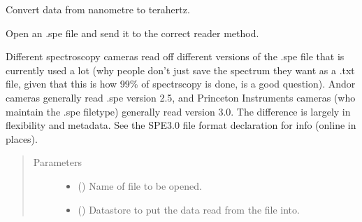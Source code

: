 \documentclass[a4paper,10pt,english]{sphinxmanual}
\begin{document}
\begin{fulllineitems}
\begin{fulllineitems}
\end{fulllineitems}


\begin{fulllineitems}
\label{\detokenize{sfgtools:sfgtools.SFGProcessTools.nm_to_thz}}
\sphinxAtStartPar
Convert data from nanometre to terahertz.

\end{fulllineitems}


\begin{fulllineitems}
\label{\detokenize{sfgtools:sfgtools.SFGProcessTools.open_spe}}
\sphinxAtStartPar
Open an .spe file and send it to the correct reader method.

\sphinxAtStartPar
Different spectroscopy cameras read off different versions of the .spe file that is currently used
a lot (why people don’t just save the spectrum they want as a .txt file, given that this is how 99\%
of spectrscopy is done, is a good question). Andor cameras generally read .spe version 2.5,
and Princeton Instruments cameras (who maintain the .spe filetype) generally read version 3.0. The
difference is largely in flexibility and metadata. See the SPE3.0 file format declaration for info
(online in places).
\begin{quote}\begin{description}
\item[{Parameters}] \leavevmode\begin{itemize}
\item {} 
\sphinxAtStartPar
{} () \textendash{} Name of file to be opened.

\item {} 
\sphinxAtStartPar
{} () \textendash{} Datastore to put the data read from the file into.


\end{itemize}
\end{description}
\end{quote}
\end{fulllineitems}
\end{fulllineitems}
\end{document}
